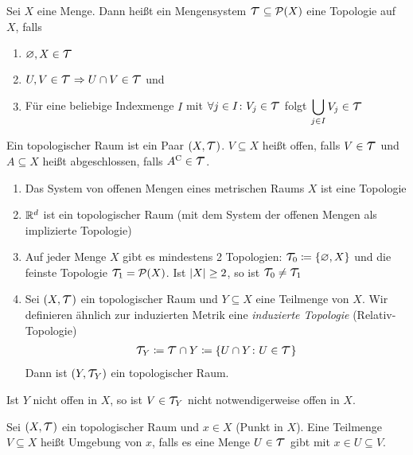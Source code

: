 \begin{definition}[Topologie]
    Sei $X$ eine Menge. Dann heißt ein Mengensystem $\Tau\subseteq\mathcal{P}\of{X}$ eine Topologie auf $X$, falls
    \begin{enumerate}[label=(\roman*)]
        \item $\emptyset, X\in\Tau$
        \item $U, V\in \Tau \impl U \cap V \in \Tau$ und
        \item Für eine beliebige Indexmenge $I$ mit $\forall j\in I\colon V_j \in \Tau$ folgt $\displaystyle\bigcup_{j\in I} V_j \in \Tau$
    \end{enumerate}
    Ein topologischer Raum ist ein Paar $\pair{X, \Tau}$. $V\subseteq X$ heißt offen, falls $V\in\Tau$ und $A\subseteq X$ heißt abgeschlossen, falls $A^{\mathrm{C}} \in\Tau$.
\end{definition}

\begin{beispiel}
    \theoremescape
    \begin{enumerate}
        \item Das System von offenen Mengen eines metrischen Raums $X$ ist eine Topologie
        \item $\mathbb{R}^d$ ist ein topologischer Raum (mit dem System der offenen Mengen als implizierte Topologie)
        \item Auf jeder Menge $X$ gibt es mindestens 2 Topologien: $\Tau_0 \coloneqq \set{\emptyset, X}$ und die feinste Topologie $\Tau_1 = \mathcal{P}\of{X}$. Ist $\left\lvert X\right\rvert \geq 2$, so ist $\Tau_0 \neq \Tau_1$
        \item Sei $\pair{X, \Tau}$ ein topologischer Raum und $Y\subseteq X$ eine Teilmenge von $X$. Wir definieren ähnlich zur induzierten Metrik eine \emph{induzierte Topologie} (Relativ-Topologie)
        \begin{align*}
            \Tau_{Y} \coloneqq \Tau \cap Y \coloneqq \set{U \cap Y \colon U\in \Tau}
        \end{align*}
        Dann ist $\pair{Y, \Tau_Y}$ ein topologischer Raum.
    \end{enumerate}
\end{beispiel}

\begin{bemerkung}
    Ist $Y$ nicht offen in $X$, so ist $V\in \Tau_Y$ nicht notwendigerweise offen in $X$.
\end{bemerkung}

\begin{definition}[Umgebung]
    Sei $\pair{X, \Tau}$ ein topologischer Raum und $x\in X$ (Punkt in $X$). Eine Teilmenge $V\subseteq X$ heißt Umgebung von $x$, falls es eine Menge $U\in\Tau$ gibt mit $x\in U \subseteq V$.
\end{definition}

